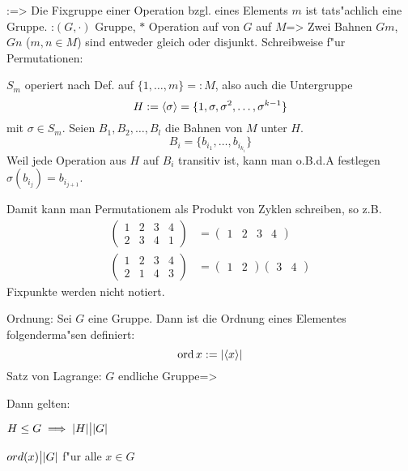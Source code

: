\theorem:=>{
  Die Fixgruppe einer Operation bzgl. eines Elements $m$ ist tats"achlich
  eine Gruppe.
  }
\lemma:$(G,\cdot)$ Gruppe, $*$ Operation auf von $G$ auf $M$=>{
  Zwei Bahnen $Gm$, $Gn$ ($m,n\in M$) sind entweder gleich oder disjunkt.
  }
\example Schreibweise f"ur Permutationen:{
  $S_m$ operiert nach Def. auf $\{1,\ldots,m\}=:M$, also auch die
  Untergruppe 
  \[H:={\left\langle\sigma\right\rangle}=\{1,\sigma,\sigma^2,\ldots,\sigma^{k-1}\}\]
  mit $\sigma\in S_m$.
  Seien $B_1,B_2,\ldots,B_l$ die Bahnen von $M$ unter $H$.
  \[B_i=\{b_{i_1},\ldots,{b_{i_{k_i}}}\}
    \]
  Weil jede Operation aus $H$ auf $B_i$ transitiv ist, kann man 
  o.B.d.A festlegen $\sigma(b_{i_j})=b_{i_{j+1}}$.
  
  Damit kann man Permutationem als Produkt von Zyklen schreiben, so z.B.
  \begin{align*}
    \begin{pmatrix}
      1&2&3&4\\
      2&3&4&1
      \end{pmatrix}&=
    \begin{pmatrix}
      1&2&3&4
      \end{pmatrix}\\
    \begin{pmatrix}
      1&2&3&4\\
      2&1&4&3
      \end{pmatrix}&=
    \begin{pmatrix}1&2\end{pmatrix}
    \begin{pmatrix}3&4\end{pmatrix}      
    \end{align*}
  Fixpunkte werden nicht notiert.
  }
 Ordnung:{
  Sei $G$ eine Gruppe. Dann ist die Ordnung eines Elementes folgenderma"sen 
  definiert:
  \[\operatorname{ord} x:=|{\left\langle x\right\rangle}|
    \]
  }
\theorem Satz von Lagrange:
  $G$ endliche Gruppe=>{
  Dann gelten:
  \begin{stmts}
    \item $H\le G\implies |H|\big||G|$
    \item $ord(x)\big||G|$ f"ur alle $x\in G$
    \end{stmts}
  }
